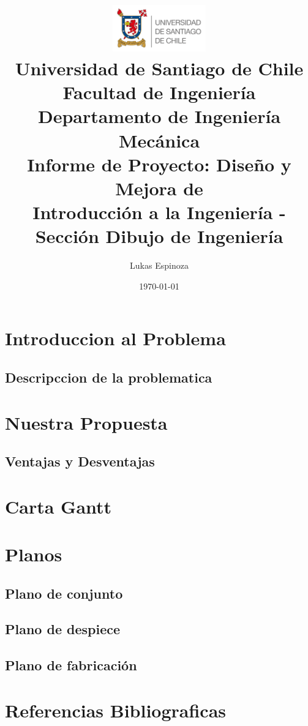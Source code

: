 \documentclass[11pt, a4paper]{article} %
\title{
    \vspace{-1cm} %
    \includegraphics[width=4cm]{usach.png}\\[1cm] %
    \textbf{Universidad de Santiago de Chile \\ Facultad de Ingeniería \\ Departamento de Ingeniería Mecánica}\\[2cm]
    \huge \textbf{Informe de Proyecto: Diseño y Mejora de } \\
    \large Introducción a la Ingeniería - Sección Dibujo de Ingeniería
}
\author{Lukas Espinoza}
\date{\today}
\begin{document}
\maketitle
\newpage
\tableofcontents


\section{Introduccion al Problema}
\subsection{Descripccion de la problematica}
\newpage


\section{Nuestra Propuesta}
\subsection{Ventajas y Desventajas}
\newpage


\section{Carta Gantt}
\section{Planos}
    \subsection{Plano de conjunto}
    \subsection{Plano de despiece}
    \subsection{Plano de fabricación}
    \newpage


\section{Referencias Bibliograficas}
\end{document}
